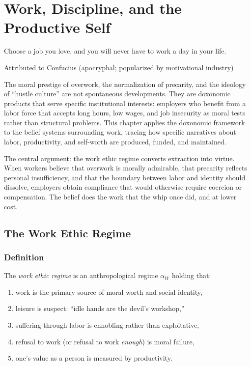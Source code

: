 \chapter{Work, Discipline, and the Productive Self}
\label{ch:work-discipline}

\epigraph{Choose a job you love, and you will never have to work a day in your life.}{Attributed to Confucius (apocryphal; popularized by motivational industry)}

\noindent
The moral prestige of overwork, the normalization of precarity, and the ideology of ``hustle culture'' are not spontaneous developments.
They are doxonomic products that serve specific institutional interests: employers who benefit from a labor force that accepts long hours, low wages, and job insecurity as moral tests rather than structural problems.
This chapter applies the doxonomic framework to the belief systems surrounding work, tracing how specific narratives about labor, productivity, and self-worth are produced, funded, and maintained.

The central argument: the work ethic regime converts extraction into virtue.
When workers believe that overwork is morally admirable, that precarity reflects personal insufficiency, and that the boundary between labor and identity should dissolve, employers obtain compliance that would otherwise require coercion or compensation.
The belief does the work that the whip once did, and at lower cost.

\section{The Work Ethic Regime}
\label{sec:ch26-overwork}

\subsection{Definition}

\begin{definition}
\label{def:work-ethic}
The \emph{work ethic regime} is an anthropological regime $\alpha_W$ holding that:
\begin{enumerate}[nosep]
  \item work is the primary source of moral worth and social identity,
  \item leisure is suspect: ``idle hands are the devil's workshop,''
  \item suffering through labor is ennobling rather than exploitative,
  \item refusal to work (or refusal to work \emph{enough}) is moral failure,
  \item one's value as a person is measured by productivity.
\end{enumerate}
\end{definition}


